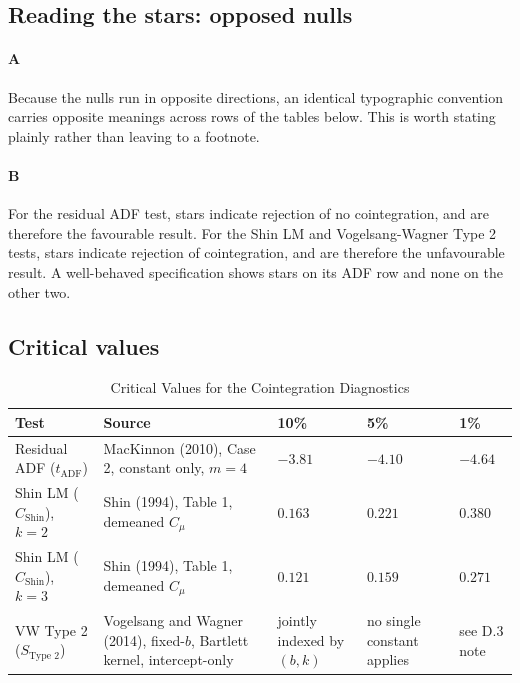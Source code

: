 \subsection{Reading the stars: opposed nulls}

\paragraph{A}
Because the nulls run in opposite directions, an identical typographic convention carries opposite meanings across rows of the tables below. This is worth stating plainly rather than leaving to a footnote.

\paragraph{B}
For the residual ADF test, stars indicate rejection of no cointegration, and are therefore the favourable result. For the Shin LM and Vogelsang-Wagner Type 2 tests, stars indicate rejection of cointegration, and are therefore the unfavourable result. A well-behaved specification shows stars on its ADF row and none on the other two.

\subsection{Critical values}

\begin{table}[H]
\centering
\caption{Critical Values for the Cointegration Diagnostics}
\label{tab:critical_values_for_the_cointegration_diagnostic}
\begin{tabular}{p{5.5cm}p{2.2cm}p{2.2cm}p{2.2cm}p{2.2cm}}
\toprule
Test & Source & 10\% & 5\% & 1\% \\
\midrule
Residual ADF ($t_{\text{ADF}}$) & MacKinnon (2010), Case 2, constant only, $m=4$ & $-3.81$ & $-4.10$ & $-4.64$ \\
Shin LM ($C_{\text{Shin}}$), $k=2$ & Shin (1994), Table 1, demeaned $C_\mu$ & $0.163$ & $0.221$ & $0.380$ \\
Shin LM ($C_{\text{Shin}}$), $k=3$ & Shin (1994), Table 1, demeaned $C_\mu$ & $0.121$ & $0.159$ & $0.271$ \\
VW Type 2 ($S_{\text{Type 2}}$) & Vogelsang and Wagner (2014), fixed-$b$, Bartlett kernel, intercept-only & jointly indexed by $(b,k)$ & no single constant applies & see D.3 note \\
\bottomrule
\end{tabular}
\end{table}


